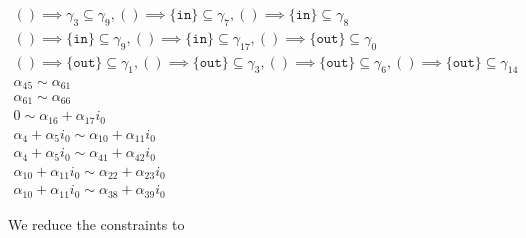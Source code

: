 {\begin{align*}
    () \implies \gamma_{3} \subseteq \gamma_{9},() \implies \{\texttt{in}\} \subseteq \gamma_{7}, () \implies \{\texttt{in}\} \subseteq \gamma_{8}\\ () \implies \{\texttt{in}\} \subseteq \gamma_{9}, () \implies \{\texttt{in}\} \subseteq \gamma_{17}, () \implies \{\texttt{out}\} \subseteq \gamma_{0}\\ () \implies \{\texttt{out}\} \subseteq \gamma_{1}, () \implies \{\texttt{out}\} \subseteq \gamma_{3}, () \implies \{\texttt{out}\} \subseteq \gamma_{6}, () \implies \{\texttt{out}\} \subseteq \gamma_{14}\\ \alpha_{45} \sim \alpha_{61}\\ \alpha_{61} \sim \alpha_{66}\\ 0 \sim \alpha_{16} + \alpha_{17}i_{0}\\ \alpha_{4} + \alpha_{5}i_{0} \sim \alpha_{10} + \alpha_{11}i_{0}\\ \alpha_{4} + \alpha_{5}i_{0} \sim \alpha_{41} + \alpha_{42}i_{0}\\ \alpha_{10} + \alpha_{11}i_{0} \sim \alpha_{22} + \alpha_{23}i_{0}\\ \alpha_{10} + \alpha_{11}i_{0} \sim \alpha_{38} + \alpha_{39}i_{0}
\end{align*}

}

We reduce the constraints to

